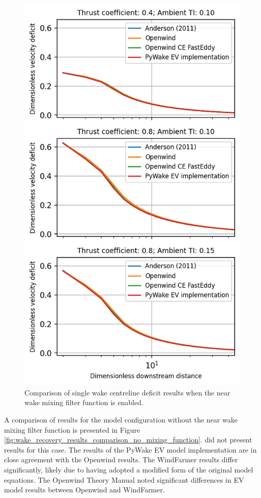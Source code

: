 \documentclass[11pt,a4paper]{article}
\begin{document}
\begin{figure}
	\centering
		\includegraphics{wake_recovery_results_comparison_mixing_function.png}
	\caption{Comparison of single wake centreline deficit results when the near wake mixing filter function is enabled.}
	\label{fig:wake_recovery_results_comparison_mixing_function}
\end{figure}

A comparison of results for the model configuration without the near wake mixing filter function is presented in Figure \ref{fig:wake_recovery_results_comparison_no_mixing_function}. \textcite{Anderson_2011} did not present results for this case. The results of the PyWake EV model implementation are in close agreement with the Openwind results. The WindFarmer results differ significantly, likely due to having adopted a modified form of the original model equations. The Openwind Theory Manual \parencite{Openwind_Theory_Manual} noted significant differences in EV model results between Openwind and WindFarmer.
\end{document}
